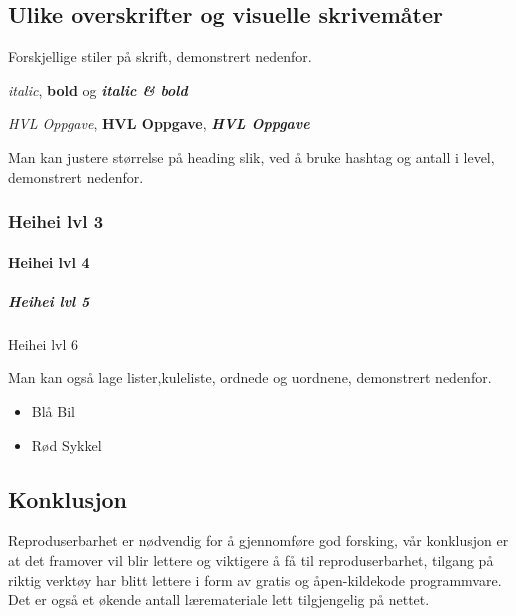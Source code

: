\documentclass[
  norsk,
]{article}
\providecommand{\tightlist}{%
  \setlength{\itemsep}{0pt}\setlength{\parskip}{0pt}}
\begin{document}
\hypertarget{ulike-overskrifter-og-visuelle-skrivemuxe5ter}{%
\subsection{\texorpdfstring{\textbf{Ulike overskrifter og visuelle
skrivemåter}}{Ulike overskrifter og visuelle skrivemåter}}\label{ulike-overskrifter-og-visuelle-skrivemuxe5ter}}

Forskjellige stiler på skrift, demonstrert nedenfor.

\emph{italic}, \textbf{bold} og \textbf{\emph{italic \& bold}}

\emph{HVL Oppgave}, \textbf{HVL Oppgave}, \textbf{\emph{HVL Oppgave}}

Man kan justere størrelse på heading slik, ved å bruke hashtag og antall
i level, demonstrert nedenfor.

\hypertarget{heihei-lvl-3}{%
\subsubsection{Heihei lvl 3}\label{heihei-lvl-3}}

\hypertarget{heihei-lvl-4}{%
\paragraph{Heihei lvl 4}\label{heihei-lvl-4}}

\hypertarget{heihei-lvl-5}{%
\subparagraph{Heihei lvl 5}\label{heihei-lvl-5}}

Heihei lvl 6

Man kan også lage lister,kuleliste, ordnede og uordnene, demonstrert
nedenfor.

\begin{itemize}
\tightlist
\item
  Blå Bil
\item
  Rød Sykkel
\end{itemize}

\hypertarget{konklusjon}{%
\subsection{\texorpdfstring{\textbf{Konklusjon}}{Konklusjon}}\label{konklusjon}}

Reproduserbarhet er nødvendig for å gjennomføre god forsking, vår
konklusjon er at det framover vil blir lettere og viktigere å få til
reproduserbarhet, tilgang på riktig verktøy har blitt lettere i form av
gratis og åpen-kildekode programmvare. Det er også et økende antall
læremateriale lett tilgjengelig på nettet.
\end{document}
